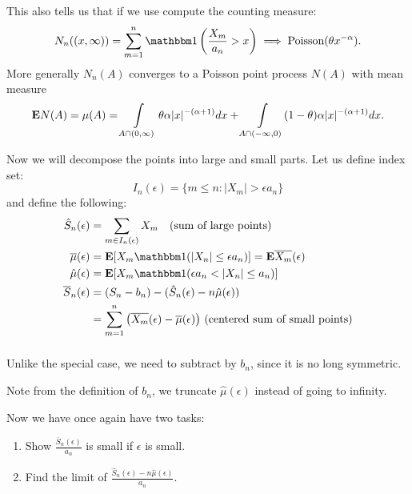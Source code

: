\documentclass[../main/main.tex]{subfiles}
\begin{document}
This also tells us that if we use compute the counting measure: \[
	N_n((x,\infty)) = \sum\limits_{m=1}^{n} \ind \left(\frac{X_m}{a_n} > x \right) \implies \Poi(\theta x^{-\alpha}).
\] More generally $N_n(A)$ converges to a Poisson point process $N(A)$ with mean measure \[
	\text{\textbf{E}} N(A) = \mu(A) = \int\limits_{A \cap (0,\infty)}\theta \alpha |x|^{-(\alpha+1)} dx + \int\limits_{A \cap (-\infty, 0)} (1-\theta) \alpha |x|^{-(\alpha+1)}dx.
\]

Now we will decompose the points into large and small parts. Let us define index set: \[
	I_n(\epsilon) = \{m \leq n: |X_m| > \epsilon a_n\}
\] and define the following:
\begin{align*}
	\hat{S}_n(\epsilon)      & = \sum\limits_{m \in I_n(\epsilon)}X_m \quad \text{(sum of large points)}                                                                          \\
	\overline{\mu}(\epsilon) & = \E [X_m \ind(|X_n|\leq \epsilon a_n)] = \E \overline{X_m}(\epsilon)                                                                              \\
	\hat{\mu}(\epsilon)      & = \E [X_m \ind(\epsilon a_n < |X_n|\leq  a_n)]                                                                                                     \\
	\overline{S}_n(\epsilon) & = (S_n - b_n) - (\hat{S}_n(\epsilon) - n \hat{\mu}(\epsilon))                                                                                      \\
	                         & = \sum\limits_{m=1}^{n} \left( \overline{X_m}(\epsilon) - \overline{\mu}(\epsilon) \right)                \, \text{(centered sum of small points)}
\end{align*}
\[
\]
\begin{remark}
	Unlike the special case, we need to subtract by $b_n$, since it is no long symmetric.
\end{remark}
\begin{remark}
	Note from the definition of $b_n$, we truncate $\hat{\mu}(\epsilon)$ instead of going to infinity.
\end{remark}

Now we have once again have two tasks:

\begin{enumerate}
	\item Show $\frac{\overline{S}_n(\epsilon)}{a_n}$ is small if $\epsilon$ is small.
	\item Find the limit of $\frac{\hat{S}_n(\epsilon) - n \hat{\mu}(\epsilon)}{a_n}$.
\end{enumerate}
\end{document}
